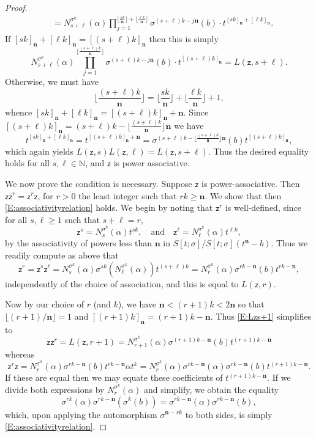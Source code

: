 \documentclass[11pt]{amsart}
\theoremstyle{plain}
\theoremstyle{definition}
\numberwithin{equation}{section}
\numberwithin{figure}{section}
\newcommand{\Sone}[1]{\Stsigma/\Stsigma (t^{\de}-#1)} %
\newcommand{\Stsigma}{S[t;\sigma]}
\newcommand{\scz}{\mathsf{z}}  %
\newcommand{\de}{\mathbf{n}}  %
\begin{document}
\begin{proof}
\begin{align*}
&= N_{s+\ell}^{\sigma^k}(\alpha)\prod_{j=1}^{\lfloor \frac{s k}{\de}\rfloor+\lfloor \frac{\ell k}{\de}\rfloor} \sigma^{(s+\ell)k-j\de }(b)  \cdot t^{[s k]_{\de} + [\ell k]_{\de}}.
\end{align*}
If $[sk]_{\de}+[\ell k]_{\de} = [(s+\ell)k]_{\de}$ then this is simply
$$
N_{s+\ell}^{\sigma^k}(\alpha)\prod_{j=1}^{\lfloor \frac{(s+\ell)k}{\de}\rfloor } \sigma^{(s+\ell)k-j\de}(b)  \cdot t^{[(s+\ell) k]_{\de}} = L(\scz,s+\ell).
$$
Otherwise, we must have
$$
\lfloor \frac{(s+\ell)k}{\de}\rfloor  = \lfloor \frac{s k}{\de}\rfloor+\lfloor \frac{\ell k}{\de}\rfloor+1,
$$
whence $
[sk]_{\de}+[\ell k]_{\de} = [(s+\ell)k]_{\de} + \de.
$
Since $[(s+\ell) k]_{\de}=(s+\ell)k-\lfloor \frac{(s+\ell)k}{\de}\rfloor \de$ we have
$$
t^{[s k]_{\de} + [\ell k]_{\de}}=t^{[(s+\ell) k]_{\de}+\de}= \sigma^{(s+\ell)k-\lfloor \frac{(s+\ell)k}{\de}\rfloor \de}(b)t^{[(s+\ell) k]_{\de}},
$$
which again yields $L(\scz,s)L(\scz,\ell)=L(\scz,s+\ell).$  Thus the desired equality holds for all $s,\ell \in \mathbb{N}$, and $\scz$ is power associative.

We now prove the condition is necessary.  Suppose $\scz$ is power-associative.  Then  $\scz\scz^r=\scz^r\scz$, for $r>0$ the least integer such that $rk\geq \de$.  We show that then  \eqref{E:associativityrelation} holds.  We begin by noting that $\scz^r$ is well-defined, since for all $s,\ell\geq 1$ such that $s+\ell=r$,
$$
\scz^s=N_s^{\sigma^k}(\alpha)t^{sk}, \quad \text{and} \quad \scz^\ell = N_\ell^{\sigma^k}(\alpha)t^{\ell k},
$$
by the associativity of powers less than $\de$ in $\Sone{b}$.  Thus we readily compute as above that
$$
\scz^r=\scz^s\scz^\ell= N_s^{\sigma^k}(\alpha)\sigma^{sk}(N_\ell^{\sigma^k}(\alpha))t^{(s+\ell)k}=N_r^{\sigma^k}(\alpha)\sigma^{rk-\de}(b)t^{rk-\de},
$$
independently of the choice of association, and this is equal to $L(\scz,r)$.

Now by our choice of $r$ (and $k$), we have $\de<(r+1)k < 2\de$ so that $\lfloor (r+1)/\de \rfloor=1$ and $[(r+1)k]_{\de}=(r+1)k-\de$.  Thus \eqref{E:Lzs+1} simplifies to
$$
\scz \scz^r=L(\scz,r+1)=N_{r+1}^{\sigma^k}(\alpha)\sigma^{(r+1)k-\de}(b)t^{(r+1)k-\de}
$$
whereas
$$  \scz^r \scz=N_r^{\sigma^k}(\alpha) \sigma^{rk-\de}(b)t^{rk-\de} \alpha t^k
= N_r^{\sigma^k}(\alpha) \sigma^{rk-\de}(\alpha)\sigma^{rk-\de}(b)t^{(r+1)k-\de}.
$$
If these are equal then we may equate these coefficients of $t^{(r+1)k-\de}$. If we divide both expressions by $N_r^{\sigma^k}(\alpha)$ and simplify, we obtain the equality
$$
\sigma^{rk}(\alpha)\sigma^{rk-\de}(\sigma^k(b))=\sigma^{rk-\de}(\alpha)\sigma^{rk-\de}(b),
$$
which, upon applying the automorphism $\sigma^{\de-rk}$ to both sides, is simply \eqref{E:associativityrelation}.
\end{proof}
\end{document}
